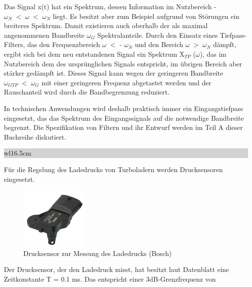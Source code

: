 \noindent Das Signal x(t) hat ein Spektrum, dessen Information im Nutzbereich - $\omega_{N} \; \mathrm{<} \; \omega \;  \mathrm{<} \; \omega_{N}$ liegt. Es besitzt aber zum Beispiel aufgrund von Störungen ein breiteres Spektrum. Damit existieren auch oberhalb der als maximal angenommenen Bandbreite $\omega _{G}$ Spektralanteile. Durch den Einsatz eines Tiefpass-Filters, das den Frequenzbereich $\omega \; \mathrm{<}$ - $\omega_{N}$ und den Bereich $\omega \; \mathrm{>} \; \omega_{N}$ dämpft, ergibt sich bei dem neu entstandenen Signal ein Spektrum X$_{TP}$ ($\omega$), das im Nutzbereich dem des ursprünglichen Signals entspricht, im übrigen Bereich aber stärker gedämpft ist. Dieses Signal kann wegen der geringeren Bandbreite $\omega_{GTP} \;  \mathrm{<} \;  \omega_{G}$ mit einer geringeren Frequenz abgetastet werden und der Rauschanteil wird durch die Bandbegrenzung reduziert.

\noindent In technischen Anwendungen wird deshalb praktisch immer ein Eingangstiefpass eingesetzt, das das Spektrum des Eingangssignals auf die notwendige Bandbreite begrenzt. Die Spezifikation von Filtern und ihr Entwurf werden im Teil A dieser Buchreihe diskutiert.\bigskip

\noindent
\colorbox{lightgray}{%
%
\renewcommand\arraystretch{0.6}%
\begin{tabular}{ wl{16.5cm} }
{\selectfont{Beispiel: Abtastung Drucksensor im Steuergerät} }
\end{tabular}%
}\medskip

\noindent Für die Regelung des Ladedrucks von Turboladern werden Drucksensoren eingesetzt. 

\begin{figure}[H]
  \centerline{\includegraphics[width=0.3\textwidth]{Kapitel1/Bilder/image13}}
  \caption{Drucksensor zur Messung des Ladedrucks (Bosch)}
  \label{fig:Drucksensor}
\end{figure}

\noindent Der Drucksensor, der den Ladedruck misst, hat besitzt laut Datenblatt eine Zeitkonstante T = 0.1 ms. Das entspricht einer 3dB-Grenzfrequenz von 

